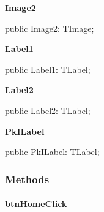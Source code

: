 \documentclass{report}
\newif\ifpdf
\begin{document}
\begin{list}{}
\par  \label{xtypefm.TimdFrm-Image2}
\item[\textbf{Image2}\hfill]
\ifpdf
\begin{flushleft}
\fi
\begin{ttfamily}
public Image2: TImage;\end{ttfamily}

\ifpdf
\end{flushleft}
\fi


\par  \label{xtypefm.TimdFrm-Label1}
\item[\textbf{Label1}\hfill]
\ifpdf
\begin{flushleft}
\fi
\begin{ttfamily}
public Label1: TLabel;\end{ttfamily}

\ifpdf
\end{flushleft}
\fi


\par  \label{xtypefm.TimdFrm-Label2}
\item[\textbf{Label2}\hfill]
\ifpdf
\begin{flushleft}
\fi
\begin{ttfamily}
public Label2: TLabel;\end{ttfamily}

\ifpdf
\end{flushleft}
\fi


\par  \label{xtypefm.TimdFrm-PkILabel}
\item[\textbf{PkILabel}\hfill]
\ifpdf
\begin{flushleft}
\fi
\begin{ttfamily}
public PkILabel: TLabel;\end{ttfamily}

\ifpdf
\end{flushleft}
\fi


\par  \end{list}
\subsubsection*{\large{\textbf{Methods}}\normalsize\hspace{1ex}\hfill}
\paragraph*{btnHomeClick}\hspace*{\fill}
\end{document}
